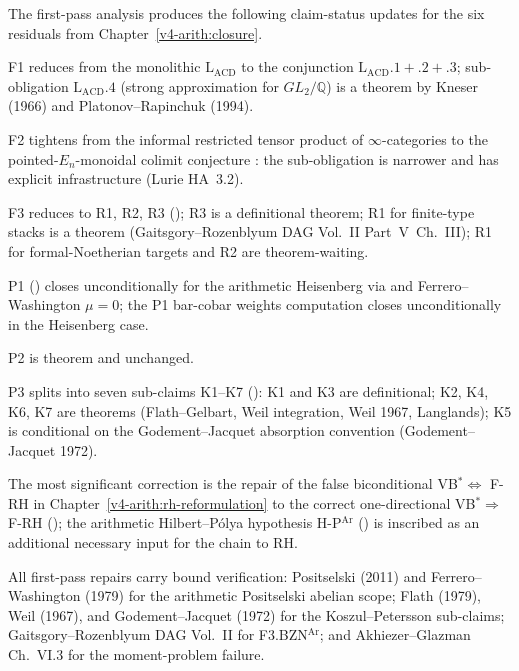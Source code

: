 The first-pass analysis produces the following claim-status updates
for the six residuals from Chapter~\ref{v4-arith:closure}.

F1 reduces from the monolithic \(\mathrm{L}_{\mathrm{ACD}}\) to the
conjunction \(\mathrm{L}_{\mathrm{ACD}}.1+.2+.3\); sub-obligation
\(\mathrm{L}_{\mathrm{ACD}}.4\) (strong approximation for
\(GL_{2}/\mathbb{Q}\)) is a theorem by Kneser (1966) and Platonov--Rapinchuk
(1994).

F2 tightens from the informal restricted tensor product of
\(\infty\)-categories to the pointed-\(E_{n}\)-monoidal colimit
conjecture : the sub-obligation is
narrower and has explicit infrastructure (Lurie HA~3.2).

F3 reduces to R1, R2, R3 ();
R3 is a definitional theorem; R1 for finite-type stacks is a theorem
(Gaitsgory--Rozenblyum DAG Vol.~II Part~V~Ch.~III); R1 for
formal-Noetherian targets and R2 are theorem-waiting.

P1 () closes unconditionally for
the arithmetic Heisenberg via
 and Ferrero--Washington
\(\mu=0\); the P1 bar-cobar weights computation closes
unconditionally in the Heisenberg case.

P2 is theorem and unchanged.

P3 splits into seven sub-claims K1--K7
(): K1 and K3 are definitional; K2,
K4, K6, K7 are theorems (Flath--Gelbart, Weil integration, Weil
1967, Langlands); K5 is conditional on the Godement--Jacquet
absorption convention (Godement--Jacquet 1972).

The most significant correction is the repair of the false
biconditional VB\(^{*}\Leftrightarrow\) F-RH in
Chapter~\ref{v4-arith:rh-reformulation} to the correct one-directional
VB\(^{*}\Rightarrow\) F-RH ();
the arithmetic Hilbert--P\'olya hypothesis H-P\(^{\mathrm{Ar}}\)
() is inscribed as an additional
necessary input for the chain to RH.

All first-pass repairs carry bound verification: Positselski (2011)
and Ferrero--Washington (1979) for the arithmetic Positselski abelian
scope; Flath (1979), Weil (1967), and Godement--Jacquet (1972) for
the Koszul--Petersson sub-claims; Gaitsgory--Rozenblyum DAG Vol.~II
for F3.BZN\(^{\mathrm{Ar}}\); and Akhiezer--Glazman Ch.~VI.3 for the
moment-problem failure.

